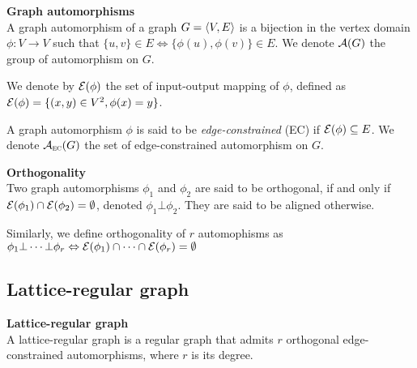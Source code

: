 
\begin{definition}\textbf{Graph automorphisms}\\
A graph automorphism of a graph $G = \langle V, E \rangle$ is a bijection in the vertex domain $\phi: V \rightarrow V$ such that $\{u,v\} \in E \Leftrightarrow \{\phi(u), \phi(v)\} \in E$. We denote $\mathcal{A}(G)$ the group of automorphism on $G$.

We denote by $\mathcal{E}(\phi)$ the set of input-output mapping of $\phi$, defined as $\mathcal{E}(\phi) = \{ (x,y) \in V^2, \phi(x) = y \}$.

A graph automorphism $\phi$ is said to be \emph{edge-constrained} (EC) if $\mathcal{E}(\phi) \subseteq E$. We denote $\mathcal{A}_{\operatorname{\textsc{ec}}}(G)$ the set of edge-constrained automorphism on $G$.
\end{definition}

\begin{definition}\textbf{Orthogonality}\\
Two graph automorphisms $\phi_1$ and $\phi_2$ are said to be orthogonal, if and only if $\mathcal{E}(\phi_1) \cap \mathcal{E}(\phi_2) = \emptyset$, denoted $\phi_1 \bot \phi_2$. They are said to be aligned otherwise.

Similarly, we define orthogonality of $r$ automophisms as $\phi_1 \bot \cdots \bot \phi_r \Leftrightarrow \mathcal{E}(\phi_1) \cap \cdots \cap \mathcal{E}(\phi_r) = \emptyset$
\end{definition}


\subsection{Lattice-regular graph}

\begin{definition}\textbf{Lattice-regular graph}\\
A lattice-regular graph is a regular graph that admits $r$ orthogonal edge-constrained automorphisms, where $r$ is its degree.
\end{definition}





